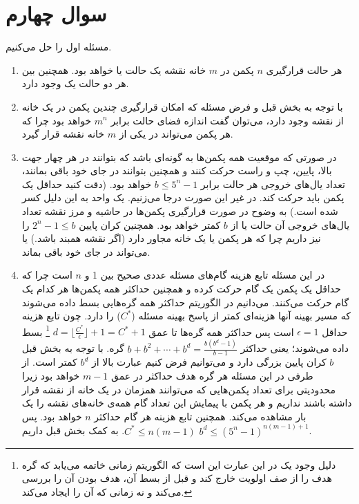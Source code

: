 \documentclass{article}
\begin{document}
	\section*{
		سوال چهارم
	}
	مسئله اول را حل می‌‌کنیم.
	\begin{enumerate}
		\item 
		هر حالت قرارگیری $n$ پکمن در $m$ خانه نقشه یک حالت یا 
		خواهد بود. همچنین بین هر دو حالت 
		یک 
		وجود دارد.
		\item 
		با توجه به بخش قبل و فرض مسئله که امکان قرارگیری چندین پکمن در یک خانه از نقشه وجود دارد، می‌توان گفت اندازه فضای حالت برابر 
		$m^n$
		خواهد بود چرا که هر پکمن می‌تواند در یکی از $m$ خانه نقشه قرار گیرد.
		\item 
		در صورتی که موقعیت همه پکمن‌ها به گونه‌ای باشد که بتوانند در هر چهار جهت بالا، پایین، چپ و راست حرکت کنند و همچنین بتوانند در جای خود باقی بمانند، تعداد یال‌های خروجی هر حالت برابر 
		$b \leq 5^n - 1$
		خواهد بود. (دقت کنید حداقل یک پکمن باید حرکت کند. در غیر این صورت درجا می‌زنیم. یک واحد به این دلیل کسر شده است.) به وضوح در صورت قرارگیری پکمن‌ها در حاشیه و مرز نقشه تعداد یال‌های خروجی آن حالت یا 
		از $b$ کمتر خواهد بود. همچنین کران پایین 
		$2^n - 1 \leq b$
		را نیز داریم چرا که هر پکمن یا یک خانه مجاور دارد (اگر نقشه همبند باشد.) یا می‌تواند در جای خود باقی بماند. 
		\item 
		در این مسئله تابع هزینه گام‌های مسئله 
		عددی صحیح بین 1 و $n$ است چرا که حداقل یک پکمن یک گام حرکت کرده و همچنین حداکثر همه پکمن‌ها هر کدام یک گام حرکت می‌کنند. می‌دانیم در الگوریتم
حداکثر همه گره‌هایی بسط داده می‌شوند که مسیر بهینه آنها هزینه‌ای کمتر از پاسخ بهینه مسئله ($ C^* $) را دارد. چون تابع هزینه حداقل $\epsilon = 1$ است پس حداکثر همه گره‌ها تا عمق 
$d = \lfloor\frac{C^*}{\epsilon}\rfloor + 1 = C^* + 1$
\footnote{
دلیل وجود یک در این عبارت این است که الگوریتم 
زمانی خاتمه می‌یابد که گره هدف را از صف اولویت خارج کند و قبل از بسط آن، هدف بودن آن را بررسی می‌کند و نه زمانی که آن را ایجاد می‌کند.
}
بسط داده می‌شوند؛ یعنی حداکثر
$b + b^2 + \cdots + b^d = \frac{b(b^{d} - 1)}{b - 1}$
گره. با توجه به بخش قبل $b$ کران پایین بزرگی دارد و می‌توانیم فرض کنیم عبارت بالا از 
$b^d$
کمتر است. از طرفی در این مسئله هر گره هدف حداکثر در عمق 
$m - 1$
خواهد بود زیرا محدودیتی برای تعداد پکمن‌هایی که می‌توانند همزمان در یک خانه از نقشه قرار داشته باشند نداریم و هر پکمن با پیمایش این تعداد گام همه‌ی خانه‌های نقشه را یک بار مشاهده می‌کند. همچنین تابع هزینه هر گام حداکثر $n$ خواهد بود. پس 
$C^* \leq n (m-1)$.
به کمک بخش قبل داریم 
$b^d \leq (5^n - 1)^{n (m-1) + 1}$.
		

\end{enumerate}
\end{document}
